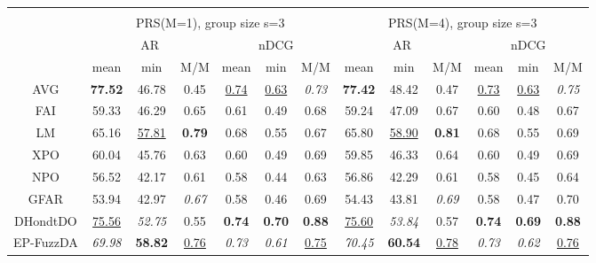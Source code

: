 \begin{tabular}{ c | c c c | c c c || c c c | c c c}
\multicolumn{12}{c}{} \\
\multicolumn{1}{c}{} & \multicolumn{6}{c}{PRS(M=1), group size s=3} & \multicolumn{6}{c}{PRS(M=4), group size s=3} \\
\multicolumn{1}{c}{} & \multicolumn{3}{c}{AR} & \multicolumn{3}{c}{nDCG} & \multicolumn{3}{c}{AR} & \multicolumn{3}{c}{nDCG} \\
& mean & min & M/M & mean & min & M/M & mean & min & M/M & mean & min & M/M \\
\hline
AVG & \textbf{77.52} & 46.78 & 0.45 & \underline{0.74} & \underline{0.63} & \textit{0.73} & \textbf{77.42} & 48.42 & 0.47 & \underline{0.73} & \underline{0.63} & \textit{0.75} \\
FAI & 59.33 & 46.29 & 0.65 & 0.61 & 0.49 & 0.68 & 59.24 & 47.09 & 0.67 & 0.60 & 0.48 & 0.67 \\
LM & 65.16 & \underline{57.81} & \textbf{0.79} & 0.68 & 0.55 & 0.67 & 65.80 & \underline{58.90} & \textbf{0.81} & 0.68 & 0.55 & 0.69 \\
XPO & 60.04 & 45.76 & 0.63 & 0.60 & 0.49 & 0.69 & 59.85 & 46.33 & 0.64 & 0.60 & 0.49 & 0.69 \\
NPO & 56.52 & 42.17 & 0.61 & 0.58 & 0.44 & 0.63 & 56.86 & 42.29 & 0.61 & 0.58 & 0.45 & 0.64 \\
GFAR & 53.94 & 42.97 & \textit{0.67} & 0.58 & 0.46 & 0.69 & 54.43 & 43.81 & \textit{0.69} & 0.58 & 0.47 & 0.70 \\
DHondtDO & \underline{75.56} & \textit{52.75} & 0.55 & \textbf{0.74} & \textbf{0.70} & \textbf{0.88} & \underline{75.60} & \textit{53.84} & 0.57 & \textbf{0.74} & \textbf{0.69} & \textbf{0.88} \\
EP-FuzzDA & \textit{69.98} & \textbf{58.82} & \underline{0.76} & \textit{0.73} & \textit{0.61} & \underline{0.75} & \textit{70.45} & \textbf{60.54} & \underline{0.78} & \textit{0.73} & \textit{0.62} & \underline{0.76} \\


\end{tabular}
